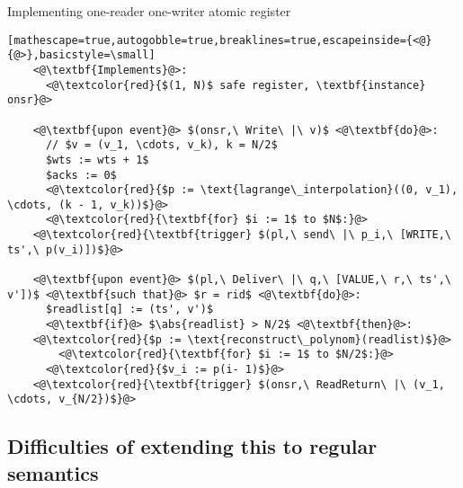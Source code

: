 \documentclass[a4paper]{scrreprt}
\DeclarePairedDelimiter\abs{\lvert}{\rvert}
\begin{document}
\begin{library}{Implementing one-reader one-writer atomic register}
  \begin{lstlisting}[mathescape=true,autogobble=true,breaklines=true,escapeinside={<@}{@>},basicstyle=\small]
    <@\textbf{Implements}@>:
      <@\textcolor{red}{$(1, N)$ safe register, \textbf{instance} onsr}@>

    <@\textbf{upon event}@> $(onsr,\ Write\ |\ v)$ <@\textbf{do}@>:
      // $v = (v_1, \cdots, v_k), k = N/2$
      $wts := wts + 1$
      $acks := 0$
      <@\textcolor{red}{$p := \text{lagrange\_interpolation}((0, v_1), \cdots, (k - 1, v_k))$}@>
      <@\textcolor{red}{\textbf{for} $i := 1$ to $N$:}@>
	<@\textcolor{red}{\textbf{trigger} $(pl,\ send\ |\ p_i,\ [WRITE,\ ts',\ p(v_i)])$}@>

    <@\textbf{upon event}@> $(pl,\ Deliver\ |\ q,\ [VALUE,\ r,\ ts',\ v'])$ <@\textbf{such that}@> $r = rid$ <@\textbf{do}@>:
      $readlist[q] := (ts', v')$
      <@\textbf{if}@> $\abs{readlist} > N/2$ <@\textbf{then}@>:
	<@\textcolor{red}{$p := \text{reconstruct\_polynom}(readlist)$}@>
        <@\textcolor{red}{\textbf{for} $i := 1$ to $N/2$:}@>
	  <@\textcolor{red}{$v_i := p(i- 1)$}@>
	<@\textcolor{red}{\textbf{trigger} $(onsr,\ ReadReturn\ |\ (v_1, \cdots, v_{N/2})$}@>
  \end{lstlisting}
\end{library}

\subsection{Difficulties of extending this to regular semantics}
\end{document}
